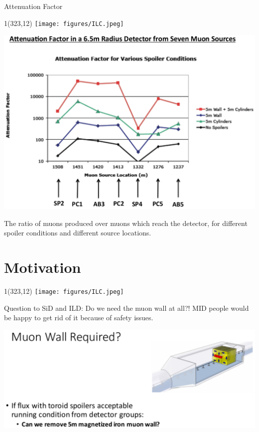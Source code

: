 \documentclass[xcolor={dvipsnames}]{beamer}
\newcommand{\ilclogo}{
  \setlength{\TPHorizModule}{1pt}
  \setlength{\TPVertModule}{1pt}
  \begin{textblock}{1}(323,12)
   \texttt{[image: figures/ILC.jpeg]}
  \end{textblock}
}
\begin{document}
\begin{frame}{Attenuation Factor}
\ilclogo
\begin{center}
\includegraphics[height=0.7\textheight]{Attenuation_Factors.pdf}
\end{center}
The ratio of muons produced over muons which reach the detector, for different spoiler conditions and different source locations.
\end{frame}


\section{Motivation}
\begin{frame}{}
\ilclogo
Question to SiD and ILD: Do we need the muon wall at all?!
MID people would be happy to get rid of it because of safety issues.
\begin{center}
\includegraphics[height=0.5\textheight]{Muon_wall_required.pdf}
\end{center}
\end{frame}
\end{document}
